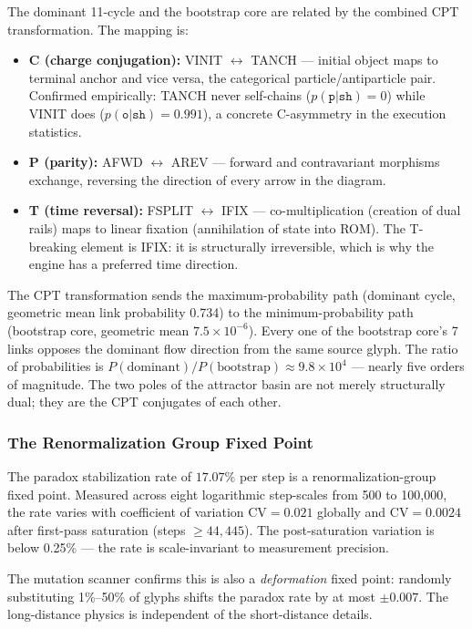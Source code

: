 \documentclass[12pt,a4paper]{article}
\begin{document}
The dominant 11-cycle and the bootstrap core are related by the combined CPT transformation. The mapping is:
\begin{itemize}
    \item \textbf{C (charge conjugation):} VINIT $\leftrightarrow$ TANCH --- initial object maps to terminal anchor and vice versa, the categorical particle/antiparticle pair. Confirmed empirically: TANCH never self-chains ($p(\texttt{p}|\texttt{sh}) = 0$) while VINIT does ($p(\texttt{o}|\texttt{sh}) = 0.991$), a concrete C-asymmetry in the execution statistics.
    \item \textbf{P (parity):} AFWD $\leftrightarrow$ AREV --- forward and contravariant morphisms exchange, reversing the direction of every arrow in the diagram.
    \item \textbf{T (time reversal):} FSPLIT $\leftrightarrow$ IFIX --- co-multiplication (creation of dual rails) maps to linear fixation (annihilation of state into ROM). The T-breaking element is IFIX: it is structurally irreversible, which is why the engine has a preferred time direction.
\end{itemize}

The CPT transformation sends the maximum-probability path (dominant cycle, geometric mean link probability 0.734) to the minimum-probability path (bootstrap core, geometric mean $7.5 \times 10^{-6}$). Every one of the bootstrap core's 7 links opposes the dominant flow direction from the same source glyph. The ratio of probabilities is $P(\text{dominant}) / P(\text{bootstrap}) \approx 9.8 \times 10^4$ --- nearly five orders of magnitude. The two poles of the attractor basin are not merely structurally dual; they are the CPT conjugates of each other.

\subsubsection{The Renormalization Group Fixed Point}

The paradox stabilization rate of $17.07\%$ per step is a renormalization-group fixed point. Measured across eight logarithmic step-scales from 500 to 100,000, the rate varies with coefficient of variation $\mathrm{CV} = 0.021$ globally and $\mathrm{CV} = 0.0024$ after first-pass saturation (steps $\geq 44{,}445$). The post-saturation variation is below 0.25\% --- the rate is scale-invariant to measurement precision.

The mutation scanner confirms this is also a \emph{deformation} fixed point: randomly substituting 1\%--50\% of glyphs shifts the paradox rate by at most $\pm 0.007$. The long-distance physics is independent of the short-distance details.
\end{document}
